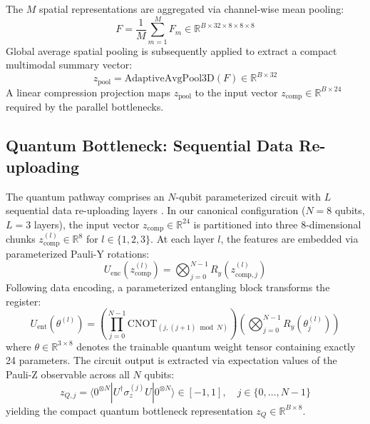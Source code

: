 The $M$ spatial representations are aggregated via channel-wise mean pooling:
\begin{equation}
    F = \frac{1}{M} \sum_{m=1}^M F_m \in \mathbb{R}^{B \times 32 \times 8 \times 8 \times 8}
\end{equation}
Global average spatial pooling is subsequently applied to extract a compact multimodal summary vector:
\begin{equation}
    z_{\text{pool}} = \text{AdaptiveAvgPool3D}(F) \in \mathbb{R}^{B \times 32}
\end{equation}
A linear compression projection maps $z_{\text{pool}}$ to the input vector $z_{\text{comp}} \in \mathbb{R}^{B \times 24}$ required by the parallel bottlenecks.

\subsection{Quantum Bottleneck: Sequential Data Re-uploading}
The quantum pathway comprises an $N$-qubit parameterized circuit with $L$ sequential data re-uploading layers \cite{perez2020data}. 
In our canonical configuration ($N=8$ qubits, $L=3$ layers), the input vector $z_{\text{comp}} \in \mathbb{R}^{24}$ is partitioned into three 8-dimensional chunks $z_{\text{comp}}^{(l)} \in \mathbb{R}^8$ for $l \in \{1, 2, 3\}$. 
At each layer $l$, the features are embedded via parameterized Pauli-Y rotations:
\begin{equation}
    U_{\text{enc}}(z_{\text{comp}}^{(l)}) = \bigotimes_{j=0}^{N-1} R_y\left(z_{\text{comp}, j}^{(l)}\right)
\end{equation}
Following data encoding, a parameterized entangling block transforms the register:
\begin{equation}
    U_{\text{ent}}(\theta^{(l)}) = \left( \prod_{j=0}^{N-1} \text{CNOT}_{(j, (j+1) \bmod N)} \right) \left( \bigotimes_{j=0}^{N-1} R_y\left(\theta_j^{(l)}\right) \right)
\end{equation}
where $\theta \in \mathbb{R}^{3 \times 8}$ denotes the trainable quantum weight tensor containing exactly 24 parameters. 
The circuit output is extracted via expectation values of the Pauli-Z observable across all $N$ qubits:
\begin{equation}
    z_{Q, j} = \langle 0^{\otimes N} | U^\dagger \sigma_z^{(j)} U | 0^{\otimes N} \rangle \in [-1, 1], \quad j \in \{0, \dots, N-1\}
\end{equation}
yielding the compact quantum bottleneck representation $z_Q \in \mathbb{R}^{B \times 8}$.


